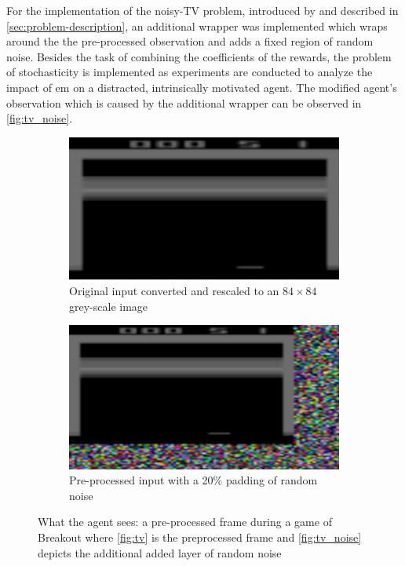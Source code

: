 \documentclass[draft,final]{vutinfth} %
\begin{document}
    For the implementation of the noisy-TV problem, introduced by \citeauthor{schmidhuber_formal_2010} and described in \autoref{sec:problem-description}, an additional wrapper was implemented which wraps around the the pre-processed observation and adds a fixed region of random noise.
    Besides the task of combining the coefficients of the rewards, the problem of stochasticity is implemented as experiments are conducted to analyze the impact of \gls{em} on a distracted, intrinsically motivated agent.
    The modified agent's observation which is caused by the additional wrapper can be observed in \autoref{fig:tv_noise}.

    \begin{figure}[h]
        \centering
        \begin{subfigure}{.40\textwidth}
            \centering
            \includegraphics[width=.9\linewidth]{figures/TV.PNG}
            \caption{Original input converted and rescaled to an $84 \times 84$ grey-scale image}
            \label{fig:tv}
        \end{subfigure}%
        \hspace{0.05\textwidth}
        \begin{subfigure}{.40\textwidth}
            \centering
            \includegraphics[width=.9\linewidth]{figures/TV_noise.PNG}
            \caption{Pre-processed input with a 20\% padding of random noise}
            \label{fig:tv_noise}
        \end{subfigure}
        \caption[What the agent sees: a pre-processed frame during a game of Breakout]{What the agent sees: a pre-processed frame during a game of Breakout where \autoref{fig:tv} is the preprocessed frame and \autoref{fig:tv_noise} depicts the additional added layer of random noise}
        \label{fig:observation}
    \end{figure}
\end{document}
